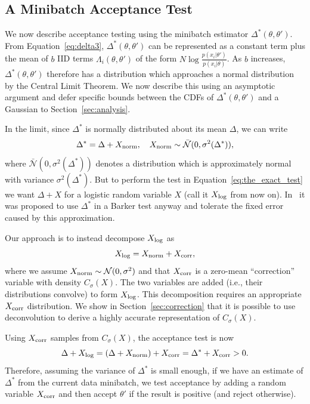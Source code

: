 \documentclass{article}
\begin{document}
\subsection{A Minibatch Acceptance Test}\label{ssec:deltas_minibatch}

We now describe acceptance testing using the minibatch estimator
$\Delta^*(\theta,\theta')$. From Equation~\ref{eq:delta3},
$\Delta^*(\theta,\theta')$ can be represented as a constant term plus the mean
of $b$ IID terms $\Lambda_i(\theta,\theta')$ of the form
$N\log\frac{p(x_i|\theta')}{p(x_i|\theta)}$. As $b$ increases,
$\Delta^*(\theta,\theta')$ therefore has a distribution which approaches a
normal distribution by the Central Limit Theorem. We now describe this using an
asymptotic argument and defer specific bounds between the CDFs of
$\Delta^*(\theta,\theta')$ and a Gaussian to Section~\ref{sec:analysis}.

In the limit, since $\Delta^*$ is normally distributed about its mean $\Delta$,
we can write
\begin{equation}\label{eq:relationship}
    \Delta^* = \Delta + X_{\rm norm}, \quad X_{\rm norm} \sim \mathcal{\bar{N}}(0, \sigma^2(\Delta^*)),
\end{equation}
where $\mathcal{\bar{N}}(0, \sigma^2(\Delta^*))$ denotes a distribution which is
approximately normal with variance $\sigma^2(\Delta^*)$.  But to perform the
test in Equation~\ref{eq:the_exact_test} we want $\Delta + X$ for a logistic
random variable $X$ (call it $X_{\rm log}$ from now on). In~\cite{Bardenet15} it
was proposed to use $\Delta^*$ in a Barker test anyway and tolerate the fixed
error caused by this approximation. 

Our approach is to instead decompose $X_{\rm log}$ as
\begin{equation}\label{eq:deconvolution}
    X_{\rm log} = X_{\rm norm}+X_{\rm corr},
\end{equation}
where we assume $X_{\rm norm} \sim \mathcal{N}(0, \sigma^2)$ and that $X_{\rm
corr}$ is a zero-mean ``correction'' variable with density $C_{\sigma}(X)$.  The
two variables are added (i.e., their distributions convolve) to form $X_{\rm
log}$.  This decomposition requires an appropriate $X_{\rm corr}$ distribution.
We show in Section~\ref{sec:correction} that it is possible to use deconvolution
to derive a highly accurate representation of $C_{\sigma}(X)$.

Using $X_{\rm corr}$ samples from $C_{\sigma}(X)$, the acceptance test is now
\begin{equation}\label{eq:criteria}
    \Delta + X_{\rm log} = (\Delta + X_{\rm norm}) + X_{\rm corr} = \Delta^* + X_{\rm corr} >0.
\end{equation}
Therefore, assuming the variance of $\Delta^*$ is small enough, if we have an
estimate of $\Delta^*$ from the current data minibatch, we test acceptance by
adding a random variable $X_{\rm corr}$ and then accept $\theta'$ if the result
is positive (and reject otherwise).
\end{document}
